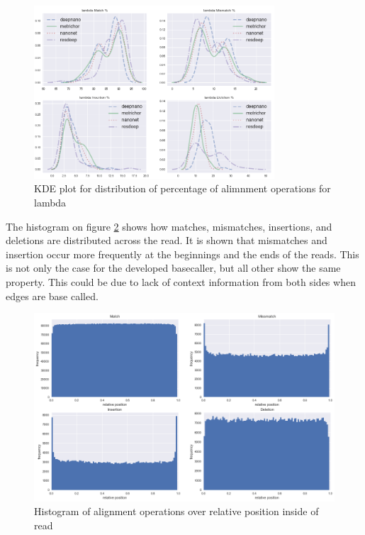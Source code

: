 \documentclass[times, utf8, diplomski, numeric, english]{fer}
\begin{document}
\begin{figure}[!htb]
	\begin{center}
		\includegraphics[width=0.8\textwidth]{./imgs/results/lambda/kde_cigar_lines.png}
		\caption{KDE plot for distribution of percentage of alimnment operations for lambda}
		\label{fg:lambda_kde}
	\end{center}
\end{figure}
\FloatBarrier

The histogram on figure \ref{fg:cigar_op_dist} shows how matches, mismatches, insertions, and deletions are distributed across the read. It is shown that mismatches and insertion occur more frequently at the beginnings and the ends of the reads. This is not only the case for the developed basecaller, but all other show the same property. This could be due to lack of context information from both sides when edges are base called.

\begin{figure}[!ht]
	\begin{center}
		\includegraphics[width=1\textwidth]{./imgs/operation_distributed_r9.png}
		\caption{Histogram of alignment operations over relative position inside of read}
		\label{fg:cigar_op_dist}
	\end{center}
\end{figure}
\end{document}
